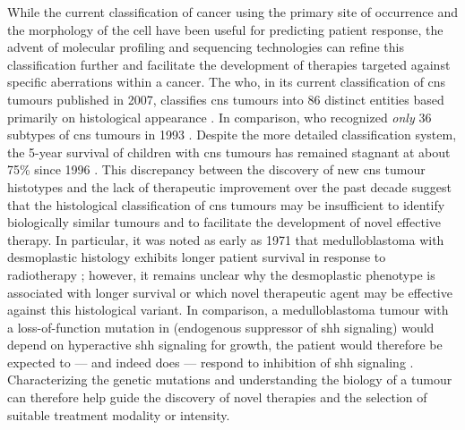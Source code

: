 While the current classification of cancer using the primary site of occurrence and the morphology of the cell have been useful for predicting patient response, the advent of molecular profiling and sequencing technologies can refine this classification further and facilitate the development of therapies targeted against specific aberrations within a cancer. The \gls{who}, in its current classification of \gls{cns} tumours published in 2007, classifies \gls{cns} tumours into 86 distinct entities based primarily on histological appearance . In comparison, \gls{who} recognized \emph{only} 36 subtypes of \gls{cns} tumours in 1993 . Despite the more detailed classification system, the 5-year survival of children with \gls{cns} tumours has remained stagnant at about 75\% since 1996 . This discrepancy between the discovery of new \gls{cns} tumour histotypes and the lack of therapeutic improvement over the past decade suggest that the histological classification of \gls{cns} tumours may be insufficient to identify biologically similar tumours and to facilitate the development of novel effective therapy. In particular, it was noted as early as 1971 that medulloblastoma with desmoplastic histology exhibits longer patient survival in response to radiotherapy ; however, it remains unclear why the desmoplastic phenotype is associated with longer survival or which novel therapeutic agent may be effective against this histological variant. In comparison, a medulloblastoma tumour with a loss-of-function mutation in  (endogenous suppressor of \gls{shh} signaling) would depend on hyperactive \gls{shh} signaling for growth, the patient would therefore be expected to --- and indeed does --- respond to inhibition of \gls{shh} signaling . Characterizing the genetic mutations and understanding the biology of a tumour can therefore help guide the discovery of novel therapies and the selection of suitable treatment modality or intensity.

